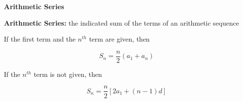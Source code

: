 \begin{center}
\textbf{Arithmetic Series}
\end{center}

\vspce

\textbf{Arithmetic Series:} the indicated sum of the terms of an  arithmetic sequence 

\vspce

If the first term and the $n^{th}$ term are given, then 

$$\displaystyle S_{n}=\frac{n}{2}(a_{1}+a_{n})$$

\vspce

If the $n^{th}$ term is not  given, then 

$$\displaystyle S_{n}=\frac{n}{2}[2a_{1}+(n-1)d]$$

